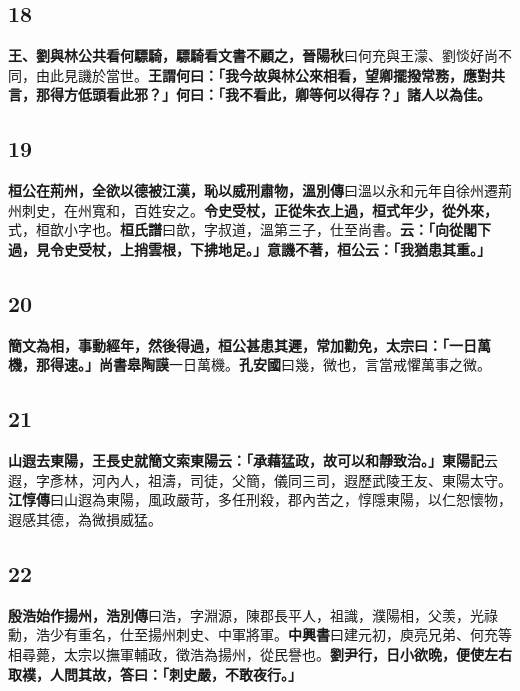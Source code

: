 \subsection*{18}

\textbf{王、劉與林公共看何驃騎，驃騎看文書不顧之，}{\footnotesize \textbf{晉陽秋}曰何充與王濛、劉惔好尚不同，由此見譏於當世。}\textbf{王謂何曰：「我今故與林公來相看，望卿擺撥常務，應對共言，那得方低頭看此邪？」何曰：「我不看此，卿等何以得存？」諸人以為佳。}

\subsection*{19}

\textbf{桓公在荊州，全欲以德被江漢，恥以威刑肅物，}{\footnotesize \textbf{溫別傳}曰溫以永和元年自徐州遷荊州刺史，在州寬和，百姓安之。}\textbf{令史受杖，正從朱衣上過，桓式年少，從外來，}{\footnotesize 式，桓歆小字也。\textbf{桓氏譜}曰歆，字叔道，溫第三子，仕至尚書。}\textbf{云：「向從閣下過，見令史受杖，上捎雲根，下拂地足。」意譏不著，桓公云：「我猶患其重。」}

\subsection*{20}

\textbf{簡文為相，事動經年，然後得過，桓公甚患其遲，常加勸免，太宗曰：「一日萬機，那得速。」}{\footnotesize \textbf{尚書皋陶謨}一日萬機。\textbf{孔安國}曰幾，微也，言當戒懼萬事之微。}

\subsection*{21}

\textbf{山遐去東陽，王長史就簡文索東陽云：「承藉猛政，故可以和靜致治。」}{\footnotesize \textbf{東陽記}云遐，字彥林，河內人，祖濤，司徒，父簡，儀同三司，遐歷武陵王友、東陽太守。\textbf{江惇傳}曰山遐為東陽，風政嚴苛，多任刑殺，郡內苦之，惇隱東陽，以仁恕懷物，遐感其德，為微損威猛。}

\subsection*{22}

\textbf{殷浩始作揚州，}{\footnotesize \textbf{浩別傳}曰浩，字淵源，陳郡長平人，祖識，濮陽相，父羡，光祿勳，浩少有重名，仕至揚州刺史、中軍將軍。\textbf{中興書}曰建元初，庾亮兄弟、何充等相尋薨，太宗以撫軍輔政，徵浩為揚州，從民譽也。}\textbf{劉尹行，日小欲晩，便使左右取襆，人問其故，答曰：「刺史嚴，不敢夜行。」}

